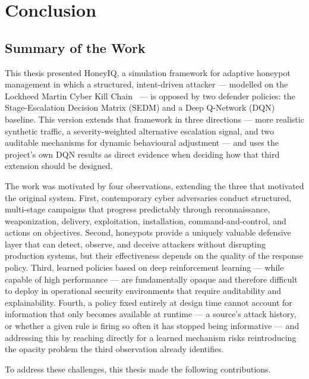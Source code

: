 \chapter{Conclusion}
\label{ch:conclusion}

\section{Summary of the Work}

This thesis presented HoneyIQ, a simulation framework for adaptive honeypot
management in which a structured, intent-driven attacker --- modelled on the
Lockheed Martin Cyber Kill Chain~\citep{hutchins2011intelligence} --- is
opposed by two defender policies: the Stage-Escalation Decision Matrix (SEDM)
and a Deep Q-Network (DQN) baseline. This version extends that framework in
three directions --- more realistic synthetic traffic, a severity-weighted
alternative escalation signal, and two auditable mechanisms for dynamic
behavioural adjustment --- and uses the project's own DQN results as direct
evidence when deciding how that third extension should be designed.

The work was motivated by four observations, extending the three that
motivated the original system.
First, contemporary cyber adversaries conduct structured, multi-stage campaigns
that progress predictably through reconnaissance, weaponization, delivery,
exploitation, installation, command-and-control, and actions on objectives.
Second, honeypots provide a uniquely valuable defensive layer that can detect,
observe, and deceive attackers without disrupting production systems, but their
effectiveness depends on the quality of the response policy.
Third, learned policies based on deep reinforcement learning --- while capable
of high performance --- are fundamentally opaque and therefore difficult to
deploy in operational security environments that require auditability and
explainability.
Fourth, a policy fixed entirely at design time cannot account for information
that only becomes available at runtime --- a source's attack history, or
whether a given rule is firing so often it has stopped being informative ---
and addressing this by reaching directly for a learned mechanism risks
reintroducing the opacity problem the third observation already identifies.

To address these challenges, this thesis made the following contributions.

